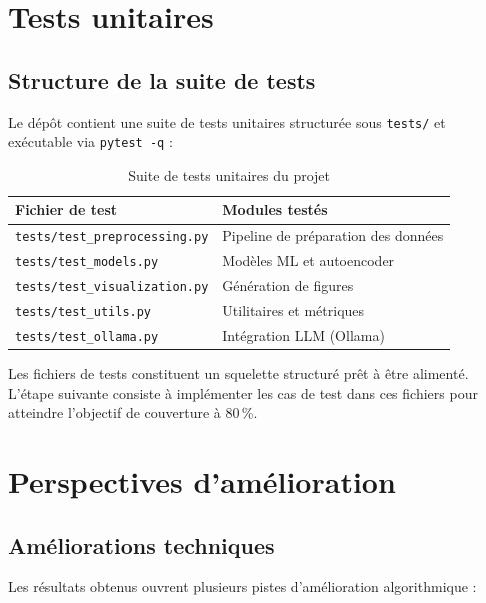 \section{Tests unitaires}

\subsection{Structure de la suite de tests}

Le dépôt contient une suite de tests unitaires structurée sous \texttt{tests/} et
exécutable via \texttt{pytest -q} :

\begin{table}[H]
\centering
\caption{Suite de tests unitaires du projet}
\label{tab:tests}
\begin{tabular}{p{5.5cm}p{7cm}}
\toprule
\textbf{Fichier de test} & \textbf{Modules testés} \\
\midrule
\texttt{tests/test\_preprocessing.py}  & Pipeline de préparation des données \\
\texttt{tests/test\_models.py}         & Modèles ML et autoencoder \\
\texttt{tests/test\_visualization.py}  & Génération de figures \\
\texttt{tests/test\_utils.py}          & Utilitaires et métriques \\
\texttt{tests/test\_ollama.py}         & Intégration LLM (Ollama) \\
\bottomrule
\end{tabular}
\end{table}

Les fichiers de tests constituent un squelette structuré prêt à être alimenté. L'étape
suivante consiste à implémenter les cas de test dans ces fichiers pour atteindre
l'objectif de couverture à 80\,\%.

\section{Perspectives d'amélioration}

\subsection{Améliorations techniques}

Les résultats obtenus ouvrent plusieurs pistes d'amélioration algorithmique :

